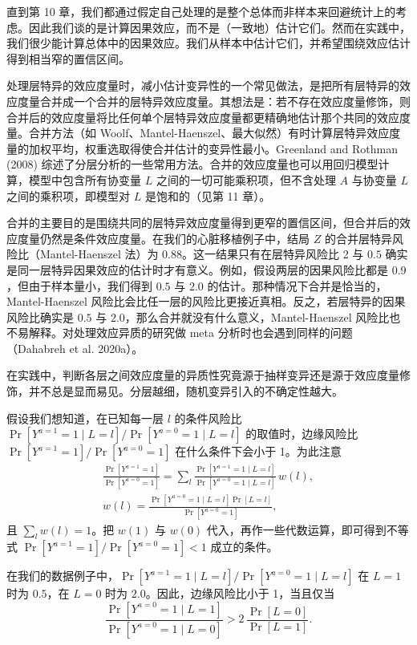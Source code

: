 \begin{techpoint}[层特异效应度量的合并]
直到第 10 章，我们都通过假定自己处理的是整个总体而非样本来回避统计上的考虑。因此我们谈的是计算因果效应，而不是（一致地）估计它们。然而在实践中，我们很少能计算总体中的因果效应。我们从样本中估计它们，并希望围绕效应估计得到相当窄的置信区间。

处理层特异的效应度量时，减小估计变异性的一个常见做法，是把所有层特异的效应度量合并成一个合并的层特异效应度量。其想法是：若不存在效应度量修饰，则合并后的效应度量将比任何单个层特异效应度量都更精确地估计那个共同的效应度量。合并方法（如 Woolf、Mantel-Haenszel、最大似然）有时计算层特异效应度量的加权平均，权重选取得使合并估计的变异性最小。Greenland and Rothman (2008) 综述了分层分析的一些常用方法。合并的效应度量也可以用回归模型计算，模型中包含所有协变量 $L$ 之间的一切可能乘积项，但不含处理 $A$ 与协变量 $L$ 之间的乘积项，即模型对 $L$ 是饱和的（见第 11 章）。

合并的主要目的是围绕共同的层特异效应度量得到更窄的置信区间，但合并后的效应度量仍然是条件效应度量。在我们的心脏移植例子中，结局 $Z$ 的合并层特异风险比（Mantel-Haenszel 法）为 $0.88$。这一结果只有在层特异风险比 2 与 $0.5$ 确实是同一层特异因果效应的估计时才有意义。例如，假设两层的因果风险比都是 $0.9$，但由于样本量小，我们得到 $0.5$ 与 $2.0$ 的估计。那种情况下合并是恰当的，Mantel-Haenszel 风险比会比任一层的风险比更接近真相。反之，若层特异的因果风险比确实是 $0.5$ 与 $2.0$，那么合并就没有什么意义，Mantel-Haenszel 风险比也不易解释。对处理效应异质的研究做 meta 分析时也会遇到同样的问题（Dahabreh et al. 2020a）。

在实践中，判断各层之间效应度量的异质性究竟源于抽样变异还是源于效应度量修饰，并不总是显而易见。分层越细，随机变异引入的不确定性越大。
\end{techpoint}

\begin{techpoint}[边缘与条件因果风险比之间的关系]
假设我们想知道，在已知每一层 $l$ 的条件风险比 $\Pr[Y^{a=1}=1\mid L=l]/\Pr[Y^{a=0}=1\mid L=l]$ 的取值时，边缘风险比 $\Pr[Y^{a=1}=1]/\Pr[Y^{a=0}=1]$ 在什么条件下会小于 1。为此注意
\begin{gather*}
\frac{\Pr[Y^{a=1}=1]}{\Pr[Y^{a=0}=1]}=
\sum_l \frac{\Pr[Y^{a=1}=1\mid L=l]}{\Pr[Y^{a=0}=1\mid L=l]}\,w(l),\\
w(l)=\frac{\Pr[Y^{a=0}=1\mid L=l]\Pr[L=l]}{\Pr[Y^{a=0}=1]},
\end{gather*}
且 $\sum_l w(l)=1$。把 $w(1)$ 与 $w(0)$ 代入，再作一些代数运算，即可得到不等式 $\Pr[Y^{a=1}=1]/\Pr[Y^{a=0}=1]<1$ 成立的条件。

在我们的数据例子中，$\Pr[Y^{a=1}=1\mid L=l]/\Pr[Y^{a=0}=1\mid L=l]$ 在 $L=1$ 时为 $0.5$，在 $L=0$ 时为 $2.0$。因此，边缘风险比小于 1，当且仅当
\[
\frac{\Pr[Y^{a=0}=1\mid L=1]}{\Pr[Y^{a=0}=1\mid L=0]}>2\,\frac{\Pr[L=0]}{\Pr[L=1]}.
\]
\end{techpoint}

